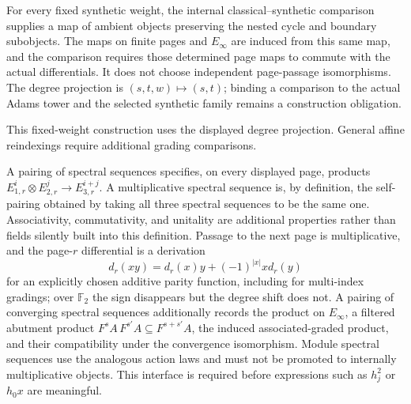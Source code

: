 \begin{definition}
  \label{def:reindexed-ss-morphism}
  \notready
  For every fixed synthetic weight, the internal classical--synthetic
  comparison supplies a map of ambient objects preserving the nested cycle
  and boundary subobjects.  The maps on finite pages and $E_\infty$ are
  induced from this same map, and the comparison requires those determined
  page maps to commute with the actual differentials.  It does not choose
  independent page-passage isomorphisms.  The degree projection is
  $(s,t,w)\mapsto(s,t)$; binding a comparison to the actual Adams tower and
  the selected synthetic family remains a construction obligation.

  This fixed-weight construction uses the displayed degree projection.
  General affine reindexings require additional grading comparisons.
\end{definition}

\begin{definition}
  \label{def:multiplicative-ss}
  \notready
  A pairing of spectral sequences specifies, on every displayed page,
  products $E_{1,r}^i\otimes E_{2,r}^j\to E_{3,r}^{i+j}$.  A multiplicative
  spectral sequence is, by definition, the self-pairing obtained by taking
  all three spectral sequences to be the same one.  Associativity,
  commutativity, and unitality are additional properties rather than fields
  silently built into this definition.  Passage to the next page is
  multiplicative, and the
  page-$r$ differential is a derivation
  \[
    d_r(xy)=d_r(x)y+(-1)^{|x|}x d_r(y)
  \]
  for an explicitly chosen additive parity function, including for
  multi-index gradings; over $\mathbb F_2$ the sign disappears but the degree
  shift does not.  A pairing of converging spectral sequences additionally
  records the product on $E_\infty$, a filtered abutment product
  $F^sA\,F^{s'}A\subseteq F^{s+s'}A$, the induced associated-graded product,
  and their compatibility under the convergence isomorphism.  Module
  spectral sequences use the analogous action laws and must not be promoted
  to internally multiplicative objects.  This interface is required before
  expressions such as $h_j^2$ or $h_0x$ are meaningful.
\end{definition}

